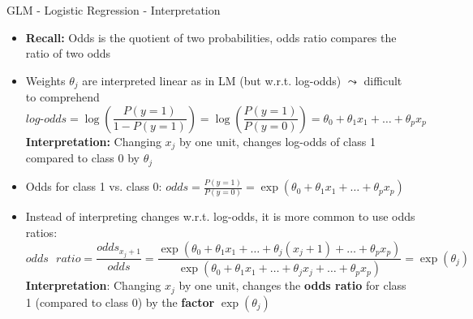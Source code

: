 \documentclass[11pt,compress,t,notes=noshow, aspectratio=169, xcolor=table]{beamer}
\begin{document}
\begin{frame}[c]{GLM - Logistic Regression - Interpretation}

    \begin{itemize}
        \item \textbf{Recall:} Odds is the quotient of two probabilities, odds ratio compares the ratio of two odds 
        \item Weights $\theta_j$ are interpreted linear as in LM (but w.r.t. log-odds) $\leadsto$ difficult to comprehend
        $$log\text{-}odds = \log \left(\frac{P(y = 1)}{1 - P(y=1)}\right) = \log \left(\frac{P(y = 1)}{P(y=0)}\right) = \theta_0 + \theta_1 x_1 + \ldots + \theta_p x_p  $$
        \textbf{Interpretation:} Changing $x_j$ by one unit, changes log-odds of class 1 compared to class 0 by $\theta_j$%
        \pause
        \item Odds for class 1 vs. class 0: %
        $odds = \displaystyle\frac{P(y = 1)}{P(y=0)}= \exp(\theta_0 + \theta_1 x_1 + \ldots + \theta_p x_p)$
        \item Instead of interpreting changes w.r.t. log-odds, it is more common to use odds ratios:
        $$odds\text{ }ratio = \frac{odds_{x_j+1}}{odds} = \frac{\exp(\theta_0 + \theta_1 x_1 + \ldots + \theta_j (x_j+1) + \ldots + \theta_p x_p)}{\exp(\theta_0 + \theta_1 x_1 + \ldots + \theta_j x_j + \ldots + \theta_p x_p)} = \exp{(\theta_j)} $$
        \textbf{Interpretation}: Changing $x_j$ by one unit, changes the \textbf{odds ratio} for class 1 (compared to class 0) by the \textbf{factor} $\exp(\theta_j)$
    \end{itemize}	

\end{frame}
\end{document}
